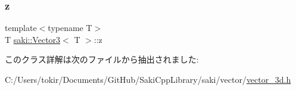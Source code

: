 \mbox{\label{classsaki_1_1_vector3_abb4ddf92f66d05e965fbd17ab3e655ff}} 
\subsubsection{\texorpdfstring{z}{z}}
{\footnotesize\ttfamily template$<$typename T$>$ \\
T \mbox{\hyperlink{classsaki_1_1_vector3}{saki\+::\+Vector3}}$<$ T $>$\+::z}



このクラス詳解は次のファイルから抽出されました\+:\begin{DoxyCompactItemize}
\item 
C\+:/\+Users/tokir/\+Documents/\+Git\+Hub/\+Saki\+Cpp\+Library/saki/vector/\mbox{\hyperlink{vector__3d_8h}{vector\+\_\+3d.\+h}}\end{DoxyCompactItemize}
